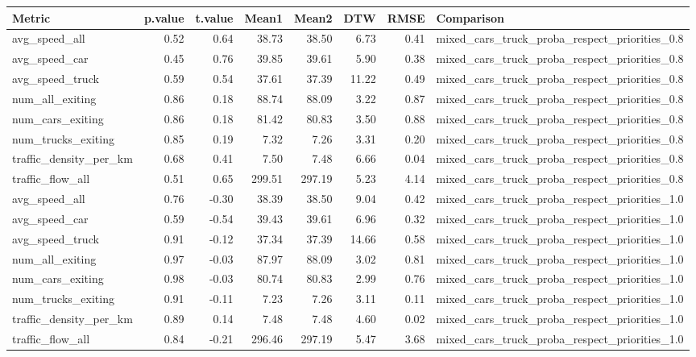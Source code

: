 \begin{table}[ht]
\centering
\begin{tabular}{lrrrrrrl}
  \hline
Metric & p.value & t.value & Mean1 & Mean2 & DTW & RMSE & Comparison \\ 
  \hline
avg\_speed\_all & 0.52 & 0.64 & 38.73 & 38.50 & 6.73 & 0.41 & mixed\_cars\_truck\_proba\_respect\_priorities\_0.8 \\ 
  avg\_speed\_car & 0.45 & 0.76 & 39.85 & 39.61 & 5.90 & 0.38 & mixed\_cars\_truck\_proba\_respect\_priorities\_0.8 \\ 
  avg\_speed\_truck & 0.59 & 0.54 & 37.61 & 37.39 & 11.22 & 0.49 & mixed\_cars\_truck\_proba\_respect\_priorities\_0.8 \\ 
  num\_all\_exiting & 0.86 & 0.18 & 88.74 & 88.09 & 3.22 & 0.87 & mixed\_cars\_truck\_proba\_respect\_priorities\_0.8 \\ 
  num\_cars\_exiting & 0.86 & 0.18 & 81.42 & 80.83 & 3.50 & 0.88 & mixed\_cars\_truck\_proba\_respect\_priorities\_0.8 \\ 
  num\_trucks\_exiting & 0.85 & 0.19 & 7.32 & 7.26 & 3.31 & 0.20 & mixed\_cars\_truck\_proba\_respect\_priorities\_0.8 \\ 
  traffic\_density\_per\_km & 0.68 & 0.41 & 7.50 & 7.48 & 6.66 & 0.04 & mixed\_cars\_truck\_proba\_respect\_priorities\_0.8 \\ 
  traffic\_flow\_all & 0.51 & 0.65 & 299.51 & 297.19 & 5.23 & 4.14 & mixed\_cars\_truck\_proba\_respect\_priorities\_0.8 \\ 
  avg\_speed\_all & 0.76 & -0.30 & 38.39 & 38.50 & 9.04 & 0.42 & mixed\_cars\_truck\_proba\_respect\_priorities\_1.0 \\ 
  avg\_speed\_car & 0.59 & -0.54 & 39.43 & 39.61 & 6.96 & 0.32 & mixed\_cars\_truck\_proba\_respect\_priorities\_1.0 \\ 
  avg\_speed\_truck & 0.91 & -0.12 & 37.34 & 37.39 & 14.66 & 0.58 & mixed\_cars\_truck\_proba\_respect\_priorities\_1.0 \\ 
  num\_all\_exiting & 0.97 & -0.03 & 87.97 & 88.09 & 3.02 & 0.81 & mixed\_cars\_truck\_proba\_respect\_priorities\_1.0 \\ 
  num\_cars\_exiting & 0.98 & -0.03 & 80.74 & 80.83 & 2.99 & 0.76 & mixed\_cars\_truck\_proba\_respect\_priorities\_1.0 \\ 
  num\_trucks\_exiting & 0.91 & -0.11 & 7.23 & 7.26 & 3.11 & 0.11 & mixed\_cars\_truck\_proba\_respect\_priorities\_1.0 \\ 
  traffic\_density\_per\_km & 0.89 & 0.14 & 7.48 & 7.48 & 4.60 & 0.02 & mixed\_cars\_truck\_proba\_respect\_priorities\_1.0 \\ 
  traffic\_flow\_all & 0.84 & -0.21 & 296.46 & 297.19 & 5.47 & 3.68 & mixed\_cars\_truck\_proba\_respect\_priorities\_1.0 \\ 
   \hline
\end{tabular}
\end{table}
